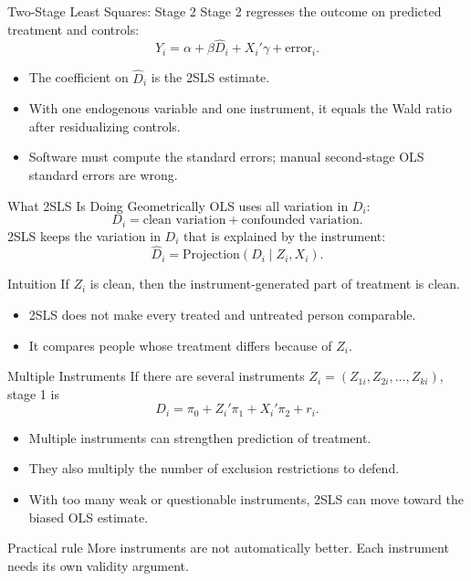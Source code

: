 \documentclass[11pt,aspectratio=169]{beamer}
\newcommand{\derivbutton}[1]{\vspace{0.4em}\hfill\hyperlink{app:#1}{\beamerbutton{Appendix details}}}
\begin{document}
\begin{frame}{Two-Stage Least Squares: Stage 2}
  Stage 2 regresses the outcome on predicted treatment and controls:
  \[
    Y_i = \alpha + \beta \hat{D}_i + X_i'\gamma + \text{error}_i.
  \]

  \begin{itemize}
    \item The coefficient on \(\hat{D}_i\) is the 2SLS estimate.
    \item With one endogenous variable and one instrument, it equals the Wald ratio after residualizing controls.
    \item Software must compute the standard errors; manual second-stage OLS standard errors are wrong.
  \end{itemize}

  \derivbutton{2sls-proof}
\end{frame}

\begin{frame}{What 2SLS Is Doing Geometrically}
  OLS uses all variation in \(D_i\):
  \[
    D_i = \text{clean variation} + \text{confounded variation}.
  \]
  2SLS keeps the variation in \(D_i\) that is explained by the instrument:
  \[
    \hat{D}_i = \mathrm{Projection}(D_i \mid Z_i,X_i).
  \]

  \begin{block}{Intuition}
    If \(Z_i\) is clean, then the instrument-generated part of treatment is clean.
  \end{block}

  \begin{itemize}
    \item 2SLS does not make every treated and untreated person comparable.
    \item It compares people whose treatment differs because of \(Z_i\).
  \end{itemize}
\end{frame}

\begin{frame}{Multiple Instruments}
  If there are several instruments \(Z_i=(Z_{1i},Z_{2i},\ldots,Z_{ki})\), stage 1 is
  \[
    D_i = \pi_0 + Z_i'\pi_1 + X_i'\pi_2 + r_i.
  \]

  \begin{itemize}
    \item Multiple instruments can strengthen prediction of treatment.
    \item They also multiply the number of exclusion restrictions to defend.
    \item With too many weak or questionable instruments, 2SLS can move toward the biased OLS estimate.
  \end{itemize}

  \begin{block}{Practical rule}
    More instruments are not automatically better. Each instrument needs its own validity argument.
  \end{block}
\end{frame}
\end{document}
